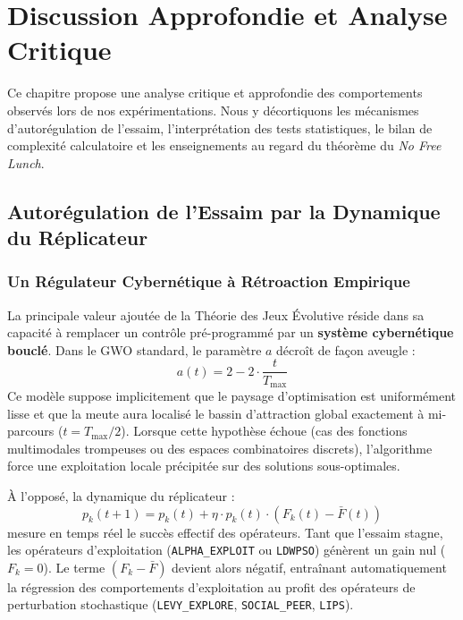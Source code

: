 \chapter{Discussion Approfondie et Analyse Critique}
\label{chap:discussion}

Ce chapitre propose une analyse critique et approfondie des comportements observés lors de nos expérimentations. Nous y décortiquons les mécanismes d'autorégulation de l'essaim, l'interprétation des tests statistiques, le bilan de complexité calculatoire et les enseignements au regard du théorème du \textit{No Free Lunch}.

\section{Autorégulation de l'Essaim par la Dynamique du Réplicateur}

\subsection{Un Régulateur Cybernétique à Rétroaction Empirique}
La principale valeur ajoutée de la Théorie des Jeux Évolutive réside dans sa capacité à remplacer un contrôle pré-programmé par un \textbf{système cybernétique bouclé}. Dans le GWO standard, le paramètre $a$ décroît de façon aveugle :
\begin{equation}
    a(t) = 2 - 2 \cdot \frac{t}{T_{\max}}
\end{equation}
Ce modèle suppose implicitement que le paysage d'optimisation est uniformément lisse et que la meute aura localisé le bassin d'attraction global exactement à mi-parcours ($t = T_{\max}/2$). Lorsque cette hypothèse échoue (cas des fonctions multimodales trompeuses ou des espaces combinatoires discrets), l'algorithme force une exploitation locale précipitée sur des solutions sous-optimales.

À l'opposé, la dynamique du réplicateur :
\begin{equation}
    p_k(t+1) = p_k(t) + \eta \cdot p_k(t) \cdot (F_k(t) - \bar{F}(t))
\end{equation}
mesure en temps réel le succès effectif des opérateurs. Tant que l'essaim stagne, les opérateurs d'exploitation (\texttt{ALPHA\_EXPLOIT} ou \texttt{LDWPSO}) génèrent un gain nul ($F_k = 0$). Le terme $(F_k - \bar{F})$ devient alors négatif, entraînant automatiquement la régression des comportements d'exploitation au profit des opérateurs de perturbation stochastique (\texttt{LEVY\_EXPLORE}, \texttt{SOCIAL\_PEER}, \texttt{LIPS}).

